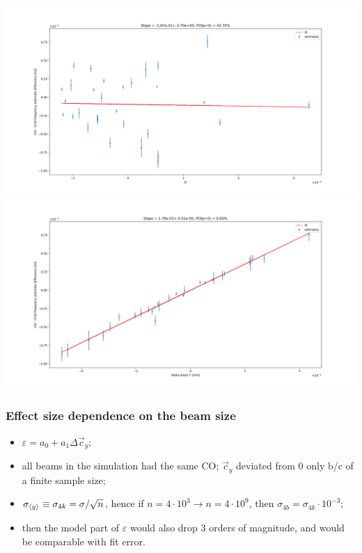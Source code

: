 \documentclass{beamer}
\begin{document}
\begin{frame}
  \includegraphics[height=.5\paperheight]{img/spin_axis_motion/freq_estimates_vs_centroid_diff_D}\\
  \vspace*{-.2cm}
  \includegraphics[height=.5\paperheight]{img/spin_axis_motion/freq_estimates_vs_centroid_diff_Y}
\end{frame}
\begin{frame}
  \frametitle{Effect size dependence on the beam size}
  \begin{itemize}
  \item $\varepsilon = a_0 + a_1\Delta \vec c_y$;
  \item all beams in the simulation had the same CO; $\vec c_y$ deviated from 0 only b/c of a finite sample size;
  \item $\sigma_{\avg{y}}\equiv \sigma_{4k} = \sigma/\sqrt{n}$, hence if $n = 4\cdot 10^3 \rightarrow n=4\cdot 10^9$, then $\sigma_{4b} = \sigma_{4k}\cdot 10^{-3}$;
  \item then the model part of $\varepsilon$ would also drop 3 orders of magnitude, and would be comparable with fit error.
  \end{itemize}
\end{frame}
\end{document}
